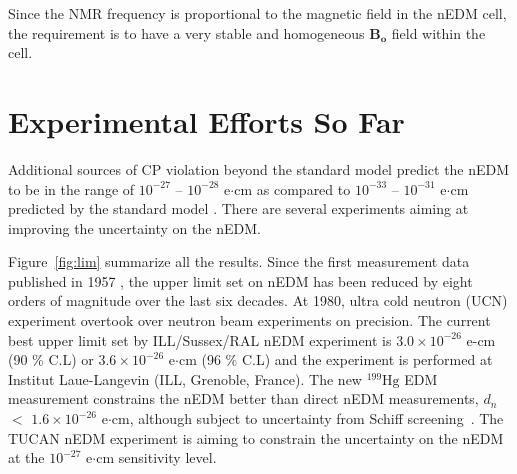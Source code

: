 Since the NMR frequency is proportional to the magnetic field in the nEDM cell, the requirement is to have a very stable and homogeneous $\bm{B_o}$ field within the cell.


\section{Experimental Efforts So Far}\label{sec:lim}

Additional sources of CP violation beyond the standard model predict the nEDM to be in the range of $10^{-27}$ -- $10^{-28}$  e$\cdot$cm as compared to $10^{-33}$ -- $10^{-31}$ e$\cdot$cm predicted by the standard model \cite{theory_lim_1, theory_lim_2, theory_lim_3}. There are several experiments aiming at improving the uncertainty on the nEDM. 


Figure~\ref{fig:lim} summarize all the results. Since the first measurement data published in 1957 \cite{1_lim}, the upper limit set on nEDM has been reduced by eight orders of magnitude over the last six decades. At 1980, ultra cold neutron (UCN) experiment overtook over neutron beam experiments on precision. The current best upper limit set by ILL/Sussex/RAL nEDM experiment is $3.0 \times 10^{-26}$ e-cm (90 \% C.L) or $3.6 \times 10^{-26}$ e$\cdot$cm (96 \% C.L) \cite{bestLim_1,bestLim_2} and the experiment is performed at Institut Laue-Langevin (ILL, Grenoble, France). The new $^{199}\mathrm{Hg}$ EDM measurement constrains the nEDM better than direct nEDM measurements, $d_n$ $<$   $\mathrm{1.6\times10^{-26}}$ e$\cdot$cm, although subject to uncertainty from Schiff screening~\cite{schiff_screen}. The TUCAN nEDM experiment is aiming to constrain the uncertainty on the nEDM at the $10^{-27}$ e$\cdot$cm sensitivity level. 

